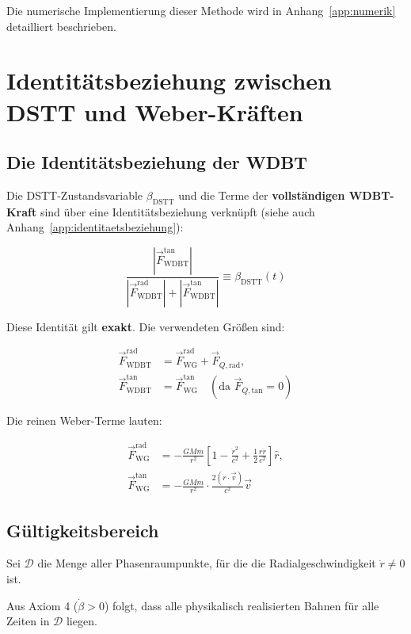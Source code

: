Die numerische Implementierung dieser Methode wird in Anhang~\ref{app:numerik} detailliert beschrieben.

\section{Identitätsbeziehung zwischen DSTT und Weber-Kräften}
\label{sec:identitaetsbeziehung}

\subsection{Die Identitätsbeziehung der WDBT}

Die DSTT-Zustandsvariable \(\beta_{\text{DSTT}}\) und die Terme der \textbf{vollständigen WDBT-Kraft} sind über eine Identitätsbeziehung verknüpft (siehe auch Anhang~\ref{app:identitaetsbeziehung}):

\[
\boxed{\frac{|\vec{F}_{\text{WDBT}}^{\text{tan}}|}{|\vec{F}_{\text{WDBT}}^{\text{rad}}| + |\vec{F}_{\text{WDBT}}^{\text{tan}}|} \equiv \beta_{\text{DSTT}}(t)}
\]

Diese Identität gilt \textbf{exakt}. Die verwendeten Größen sind:

\[
\begin{aligned}
\vec{F}_{\text{WDBT}}^{\text{rad}} &= \vec{F}_{\text{WG}}^{\text{rad}} + \vec{F}_{Q,\text{rad}}, \\[2mm]
\vec{F}_{\text{WDBT}}^{\text{tan}} &= \vec{F}_{\text{WG}}^{\text{tan}} \quad (\text{da } \vec{F}_{Q,\text{tan}} = 0)
\end{aligned}
\]

Die reinen Weber-Terme lauten:

\[
\begin{aligned}
\vec{F}_{\text{WG}}^{\text{rad}} &= -\frac{GMm}{r^2} \left[ 1 - \frac{\dot{r}^2}{c^2} + \frac{1}{2} \frac{r\ddot{r}}{c^2} \right] \hat{r}, \\[2mm]
\vec{F}_{\text{WG}}^{\text{tan}} &= -\frac{GMm}{r^2} \cdot \frac{2(\dot{r} \cdot \vec{v})}{c^2} \vec{v}
\end{aligned}
\]

\subsection{Gültigkeitsbereich}

Sei \(\mathcal{D}\) die Menge aller Phasenraumpunkte, für die die Radialgeschwindigkeit \(\dot{r} \neq 0\) ist.

Aus Axiom 4 (\(\dot{\beta} > 0\)) folgt, dass alle physikalisch realisierten Bahnen für alle Zeiten in \(\mathcal{D}\) liegen.

